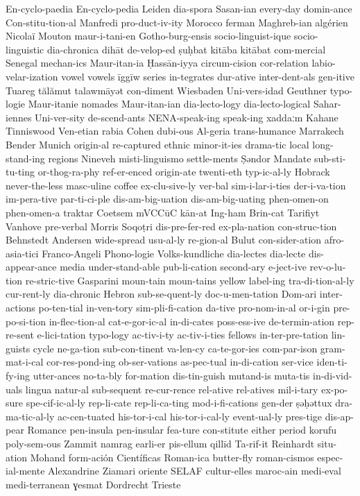{En-cyclo-paedia
En-cyclo-pedia
Leiden
dia-spora
Sasan-ian
every-day
domin-ance
Con-stitu-tion-al
Manfredi
pro-duct-iv-ity
Morocco
ferman
Maghreb-ian
algérien
Nicolaï
Mouton
maur-i-tani-en
Gotho-burg-ensis
socio-linguist-ique
socio-linguistic
dia-chronica
dihāt
de-velop-ed
ṣuḥbat
kitāba
kitābat
com-mercial
Senegal
mechan-ics
Maur-itan-ia
Ḥassān-iyya
circum-cision
cor-relation
labio-velar-ization
vowel
vowels
īggīw
series
in-tegrates
dur-ative
inter-dent-als
gen-itive
Tuareg
tălămut
talawmāyət
con-diment
Wiesbaden
Uni-vers-idad
Geuthner
typo-logie
Maur-itanie
nomades
Maur-itan-ian
dia-lecto-logy
dia-lecto-logical
Sahar-iennes
Uni-ver-sity
de-scend-ants
NENA-speak-ing
speak-ing
xaddaːm
Kahane
Tinniswood
Ven-etian
rabia
Cohen
dubi-ous
Al-geria
trans-humance
Marrakech
Bender
Munich
origin-al
re-captured
ethnic
minor-it-ies
drama-tic
local
long-stand-ing
regions
Nineveh
misti-linguismo
settle-ments
Ṣəndor
Mandate
sub-sti-tu-ting
or-thog-ra-phy
ref-er-enced
origin-ate
twenti-eth
typ-ic-al-ly
Hobrack
never-the-less
masc-uline
coffee
ex-clu-sive-ly
ver-bal
sim-i-lar-i-ties
der-i-va-tion
im-pera-tive
par-ti-ci-ple
dis-am-big-uation
dis-am-big-uating
phen-omen-on
phen-omen-a
traktar
Coetsem
mVCCūC
kān-at
Ing-ham
Brin-cat
Tarifiyt
Vanhove
pre-verbal
Morris
Soqoṭri
dis-pre-fer-red
ex-pla-nation
con-struc-tion
Behnstedt
Andersen
wide-spread
usu-al-ly
re-gion-al
Bulut
con-sider-ation
afro-asia-tici
Franco-Angeli
Phono-logie
Volks-kundliche
dia-lectes
dia-lecte
dis-appear-ance
media
under-stand-able
pub-li-cation
second-ary
e-ject-ive
rev-o-lu-tion
re-stric-tive
Gasparini
moun-tain
moun-tains
yellow
label-ing
tra-di-tion-al-ly
cur-rent-ly
dia-chronic
Hebron
sub-se-quent-ly
doc-u-men-tation
Dom-ari
inter-actions
po-ten-tial
in-ven-tory
sim-pli-fi-cation
da-tive
pro-nom-in-al
or-i-gin
pre-po-si-tion
in-flec-tion-al
cat-e-gor-ic-al
in-di-cates
poss-ess-ive
de-termin-ation
rep-re-sent
e-lici-tation
typo-logy
ac-tiv-i-ty
ac-tiv-i-ties
fellows
in-ter-pre-tation
lin-guists
cycle
ne-ga-tion
sub-con-tinent
va-len-cy
ca-te-gor-ies
com-par-ison
gram-mat-i-cal
cor-res-pond-ing
ob-ser-vations
as-pec-tual
in-di-cation
ser-vice
iden-ti-fy-ing
utter-ances
no-ta-bly
for-mation
dis-tin-guish
mutand-is
muta-tis
in-di-vid-uals
lingua
natur-al
sub-sequent
re-cur-rence
rel-ative
rel-atives
mil-i-tary
ex-po-sure
spe-cif-ic-al-ly
rep-li-cate
rep-li-ca-ting
mod-i-fi-cations
gen-der
ṣəḥəttux
dra-ma-tic-al-ly
ac-cen-tuated
his-tor-i-cal
his-tor-i-cal-ly
event-ual-ly
pres-tige
dis-ap-pear
Romance
pen-insula
pen-insular
fea-ture
con-stitute
either
period
korufu
poly-sem-ous
Zammit
namrag
earli-er
pis-ellum
qillīd
Ta-rif-it
Reinhardt
situ-ation
Mohand
form-ación
Científicas
Roman-ica
butter-fly
roman-cismos
espec-ial-mente
Alexandrine
Ziamari
oriente
SELAF
cultur-elles
maroc-ain
medi-eval
medi-terranean
ɣesmat
Dordrecht
Trieste
}